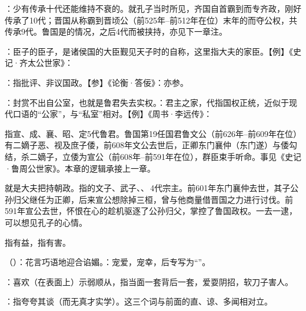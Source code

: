 {\item {}：少有传承十代还能维持不衰的。就孔子当时所见，齐国自首霸到而专齐政，刚好传承了10代；晋国从称霸到晋顷公（前525年--前512年在位）末年的而夺公权，共传承9代。鲁国是的情况，之后4代而被挟持，亦见下一章注。
\item {}：臣子的臣子，是诸侯国的大臣觐见天子时的自称，这里指大夫的家臣。【例】《史记·齐太公世家》：
\item {}：指批评、非议国政。【参】《论衡·答佞》：亦参。
}
{}


{
\item {}：封赏不出自公室，也就是鲁君失去实权。：君主之家，代指国权正统，近似于现代口语的“公家”，与“私室”相对。【例】《周书·李远传》：

指宣、成、襄、昭、定5代鲁君。鲁国第19任国君鲁文公（前626年--前609年在位）有二嫡子恶、视及庶子倭，前608年文公去世后，正卿东门襄仲（东门遂）与倭勾结，杀二嫡子，立倭为宣公（前608年--前591年在位），群臣束手听命。事见《史记·鲁周公世家》。本章的逻辑承接上一章。

\item {}就是大夫把持朝政。指的文子、武子、、\,4代宗主。前601年东门襄仲去世，其子公孙归父继任为正卿，后来宣公想除掉三桓，曾与他商量借晋国之力进行讨伐。前591年宣公去世，怀恨在心的趁机驱逐了公孙归父，掌控了鲁国政权。一去一逮，可以想见孔子的心情。
}
{}


{
\item {}指有益，指有害。
\item {}（）：花言巧语地迎合谄媚。：宠爱，宠幸，后专写为“”。
\item {}：喜欢（在表面上）示弱顺从，指当面一套背后一套，爱耍阴招，软刀子害人。
\item {}：指夸夸其谈（而无真才实学）。这三个词与前面的直、谅、多闻相对立。
}
{}


